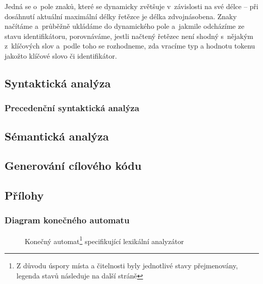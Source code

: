 \documentclass[a4paper,12pt]{article}
\begin{document}
Jedná se o~pole znaků, které se dynamicky zvětšuje v~závislosti na své délce -- při dosáhnutí aktuální maximální délky řetězce je délka zdvojnásobena. Znaky načítáme a~průběžně ukládáme do dynamického pole
a~jakmile odcházíme ze stavu identifikátoru, porovnáváme, jestli načtený řetězec není shodný s~nějakým z~klíčových slov a~podle
toho se rozhodneme, zda vracíme typ a hodnotu tokenu jakožto klíčové slovo či identifikátor.

\subsection{Syntaktická analýza}

\subsubsection{Precedenční syntaktická analýza}

\clearpage

\subsection{Sémantická analýza}

\subsection{Generování cílového kódu}

\clearpage

\subsection{Přílohy}

\subsubsection{Diagram konečného automatu}

\begin{figure}[htp!]
	\centerline{}
	\begin{minipage}{\textwidth}
		\vspace{1.5em}
		\caption{Konečný automat\protect\footnote{Z důvodu úspory místa a čitelnosti byly jednotlivé stavy přejmenovány, legenda stavů následuje na další stráně} specifikující lexikální analyzátor}
		\label{fig:DKA}
	\end{minipage}
\end{figure}
\end{document}
